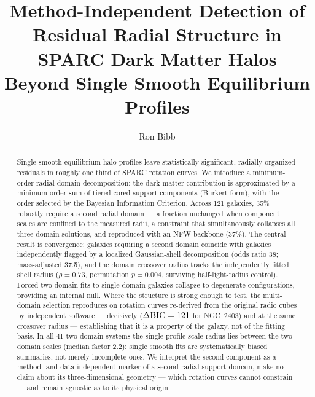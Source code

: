 \documentclass[twocolumn]{aastex631}
\newcommand{\dbic}{\Delta{\rm BIC}}
\begin{document}
\title{Method-Independent Detection of Residual Radial Structure in SPARC
Dark Matter Halos Beyond Single Smooth Equilibrium Profiles}

\author[0009-0004-1153-2464]{Ron Bibb}

\begin{abstract}
Single smooth equilibrium halo profiles leave statistically significant,
radially organized residuals in roughly one third of SPARC rotation curves.
We introduce a minimum-order radial-domain decomposition: the dark-matter
contribution is approximated by a minimum-order sum of tiered cored support
components (Burkert form), with the order selected by the Bayesian
Information Criterion. Across 121 galaxies, 35\% robustly require a second
radial domain --- a fraction unchanged when component scales are confined to
the measured radii, a constraint that simultaneously collapses all
three-domain solutions, and reproduced with an NFW backbone (37\%). The
central result is convergence: galaxies requiring a second domain coincide
with galaxies independently flagged by a localized Gaussian-shell
decomposition (odds ratio 38; mass-adjusted 37.5), and the domain crossover
radius tracks the independently fitted shell radius ($\rho = 0.73$,
permutation $p = 0.004$, surviving half-light-radius control). Forced
two-domain fits to single-domain galaxies collapse to degenerate
configurations, providing an internal null. Where the structure is strong
enough to test, the multi-domain selection reproduces on rotation curves
re-derived from the original radio cubes by independent software --- decisively
($\dbic = 121$ for NGC~2403) and at the same crossover radius --- establishing
that it is a property of the galaxy, not of the fitting basis. In all 41
two-domain systems the
single-profile scale radius lies between the two domain scales (median
factor 2.2): single smooth fits are systematically biased summaries, not
merely incomplete ones. We interpret the second component as a method- and
data-independent marker of a second radial support domain, make no claim about
its three-dimensional geometry --- which rotation curves cannot constrain ---
and remain agnostic as to its physical origin.
\end{abstract}


\end{document}
